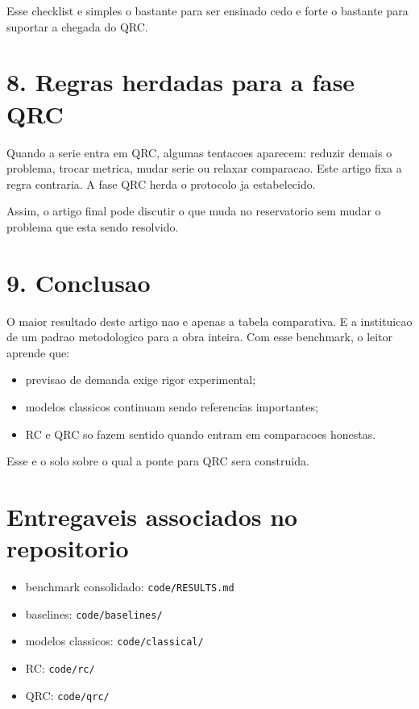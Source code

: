 \documentclass[12pt]{article}
\providecommand{\tightlist}{%
  \setlength{\itemsep}{0pt}\setlength{\parskip}{0pt}}
\begin{document}
Esse checklist e simples o bastante para ser ensinado cedo e forte o bastante para suportar a chegada do QRC.

\section{8. Regras herdadas para a fase QRC}\label{8-regras-herdadas-para-a-fase-qrc}

Quando a serie entra em QRC, algumas tentacoes aparecem: reduzir demais o problema, trocar metrica, mudar serie ou relaxar comparacao. Este artigo fixa a regra contraria. A fase QRC herda o protocolo ja estabelecido.

Assim, o artigo final pode discutir o que muda no reservatorio sem mudar o problema que esta sendo resolvido.

\section{9. Conclusao}\label{9-conclusao}

O maior resultado deste artigo nao e apenas a tabela comparativa. E a instituicao de um padrao metodologico para a obra inteira. Com esse benchmark, o leitor aprende que:

\begin{itemize}
\tightlist
\item
  previsao de demanda exige rigor experimental;
\item
  modelos classicos continuam sendo referencias importantes;
\item
  RC e QRC so fazem sentido quando entram em comparacoes honestas.
\end{itemize}

Esse e o solo sobre o qual a ponte para QRC sera construida.

\section{Entregaveis associados no repositorio}\label{entregaveis-associados-no-repositorio}

\begin{itemize}
\tightlist
\item
  benchmark consolidado: \texttt{code/RESULTS.md}
\item
  baselines: \texttt{code/baselines/}
\item
  modelos classicos: \texttt{code/classical/}
\item
  RC: \texttt{code/rc/}
\item
  QRC: \texttt{code/qrc/}
\end{itemize}
\end{document}
